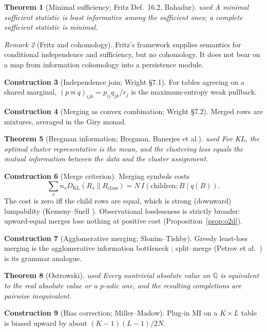 \documentclass[11pt]{article}
\newtheorem{theorem}{Theorem}[section]
\theoremstyle{definition}
\newtheorem{construction}[theorem]{Construction}
\theoremstyle{remark}
\newtheorem{remark}[theorem]{Remark}
\newcommand{\Q}{\mathbb{Q}}
\newcommand{\KL}{D_{\mathrm{KL}}}
\newcommand{\st}[1]{\textsf{\small\color{gray}#1}}
\begin{document}
\begin{theorem}[Minimal sufficiency; Fritz Def.~16.2, Bahadur]\label{res:auto5}\st{used}
A minimal sufficient statistic is least informative among the sufficient ones; a complete sufficient statistic is minimal.
\end{theorem}
\begin{remark}[Fritz and cohomology]
Fritz's framework supplies semantics for conditional independence and sufficiency, but no cohomology. It does not bear on a map from information cohomology into a persistence module.
\end{remark}
\begin{construction}[Independence join; Wright \S7.1] For tables agreeing on a shared marginal, $(p\bowtie q)_{ijk}=p_{ij}q_{jk}/r_j$ is the maximum-entropy weak pullback. \cite{wright}\end{construction}
\begin{construction}[Merging as convex combination; Wright \S7.2] Merged rows are mixtures, averaged in the Giry monad. \cite{wright}\end{construction}
\begin{theorem}[Bregman information; Bregman, Banerjee et al.]\label{thm:breg}\st{used}
For KL, the optimal cluster representative is the mean, and the clustering loss equals the mutual information between the data and the cluster assignment.
\end{theorem}
\begin{construction}[Merge criterion]
Merging symbols costs
\[\textstyle\sum_s n_s\KL(R_s\|R_{\text{class}})=N\,I(\text{children};B\mid q(B)).\] The cost is zero iff the child rows are equal, which is strong (downward) lumpability (Kemeny--Snell \cite{kemeny}). Observational losslessness is strictly broader: upward-equal merges lose nothing at positive cost (Proposition~\ref{prop:o2d}).
\end{construction}
\begin{construction}[Agglomerative merging; Slonim--Tishby] Greedy least-loss merging is the agglomerative information bottleneck \cite{slonim}; split--merge (Petrov et al.\ \cite{petrov}) is its grammar analogue.\end{construction}
\begin{theorem}[Ostrowski]\label{thm:ostrowski}\st{used} \cite{ostrowski}
Every nontrivial absolute value on $\Q$ is equivalent to the real absolute value or a $p$-adic one, and the resulting completions are pairwise inequivalent.
\end{theorem}
\begin{construction}[Bias correction; Miller--Madow] Plug-in MI on a $K\times L$ table is biased upward by about $(K-1)(L-1)/2N$. \cite{mm}\end{construction}
\end{document}

